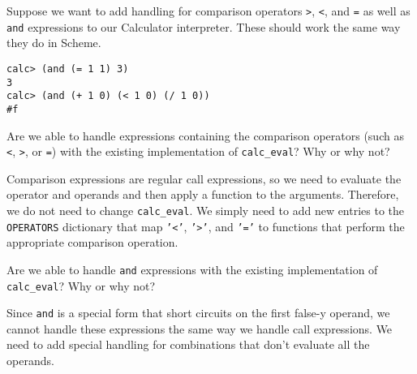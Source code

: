 \question Suppose we want to add handling for comparison operators \texttt{>},
\texttt{<}, and \texttt{=} as well as \texttt{and} expressions to our
Calculator interpreter.  These should work the same way they do in Scheme.

\begin{lstlisting}
calc> (and (= 1 1) 3)
3
calc> (and (+ 1 0) (< 1 0) (/ 1 0))
#f
\end{lstlisting}

\begin{subparts}
\subpart Are we able to handle expressions containing the comparison operators
(such as \texttt{<}, \texttt{>}, or \texttt{=}) with the existing implementation
of \texttt{calc\_eval}? Why or why not?

\begin{solution}[0.3in]
Comparison expressions are regular call expressions, so we need to evaluate the
operator and operands and then apply a function to the arguments.  Therefore,
we do not need to change \texttt{calc\_eval}. We simply need to add new entries
to the \texttt{OPERATORS} dictionary that map \texttt{'<'}, \texttt{'>'}, and
\texttt{'='} to functions that perform the appropriate comparison operation.
\end{solution}

\subpart Are we able to handle \texttt{and} expressions with the existing
implementation of \texttt{calc\_eval}? Why or why not?

\begin{solution}[0.3in]
Since \texttt{and} is a special form that short circuits on the first false-y
operand, we cannot handle these expressions the same way we handle call
expressions.  We need to add special handling for combinations that don't
evaluate all the operands.
\end{solution}


\end{subparts}
